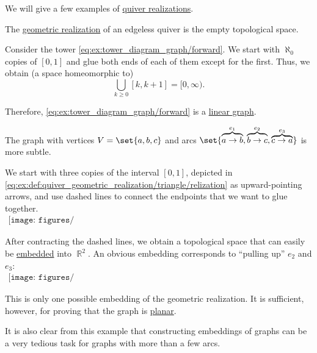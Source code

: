 \begin{example}\label{ex:def:quiver_geometric_realization}
  We will give a few examples of \hyperref[def:quiver_geometric_realization]{quiver realizations}.

  \begin{thmenum}
     The \hyperref[def:quiver_geometric_realization]{geometric realization} of an edgeless quiver is the empty topological space.

     Consider the tower \eqref{eq:ex:tower_diagram_graph/forward}. We start with \( \aleph_0 \) copies of \( [0, 1] \) and glue both ends of each of them except for the first. Thus, we obtain (a space homeomorphic to)
    \begin{equation*}
      \bigcup_{k \geq 0} [k, k + 1] = [0, \infty).
    \end{equation*}

    Therefore, \eqref{eq:ex:tower_diagram_graph/forward} is a \hyperref[def:quiver_geometric_realization/linear]{linear graph}.

     The graph with vertices \( V = \set{ a, b, c } \) and arcs \( \set{ \overbrace{a \to b}^{e_1}, \overbrace{b \to c}^{e_2}, \overbrace{c \to a}^{e_3} } \) is more subtle.

    We start with three copies of the interval \( [0, 1] \), depicted in \eqref{eq:ex:def:quiver_geometric_realization/triangle/relization} as upward-pointing arrows, and use dashed lines to connect the endpoints that we want to glue together.
    \begin{equation}\label{eq:ex:def:quiver_geometric_realization/triangle/relization}
      \begin{aligned}
        \texttt{[image: figures/eq\_\_ex\_\_def\_\_graph\_geometric\_realization\_\_triangle\_\_realization.pdf]}
      \end{aligned}
    \end{equation}

    After contracting the dashed lines, we obtain a topological space that can easily be \hyperref[def:quiver_geometric_realization/embedding]{embedded} into \( \BbbR^2 \). An obvious embedding corresponds to \enquote{pulling up} \( e_2 \) and \( e_3 \):
    \begin{equation}\label{eq:ex:def:quiver_geometric_realization/triangle/embedding}
      \begin{aligned}
        \texttt{[image: figures/eq\_\_ex\_\_def\_\_graph\_geometric\_realization\_\_triangle\_\_embedding.pdf]}
      \end{aligned}
    \end{equation}

    This is only one possible embedding of the geometric realization. It is sufficient, however, for proving that the graph is \hyperref[def:quiver_geometric_realization/planar]{planar}.

    It is also clear from this example that constructing embeddings of graphs can be a very tedious task for graphs with more than a few arcs.
  \end{thmenum}
\end{example}
